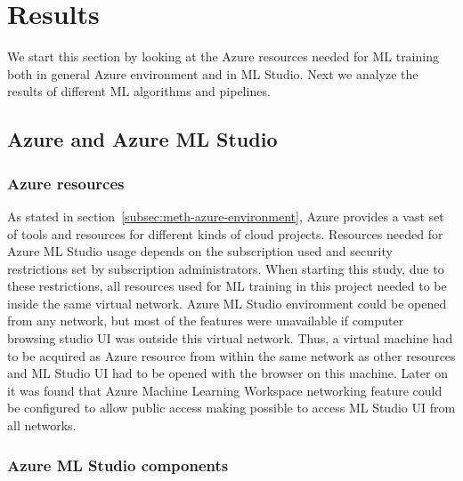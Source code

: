 

\section{Results}\label{sec:results}

We start this section by looking at
the Azure resources needed for ML training
both in general Azure environment and in ML Studio.
Next we analyze the results of
different ML algorithms and pipelines.


\subsection{Azure and Azure ML Studio}\label{subsec:res-azure-and-azure-ml-studio}

\subsubsection*{Azure resources}

As stated in section~\ref{subsec:meth-azure-environment},
Azure provides a vast set of tools and resources
for different kinds of cloud projects.
Resources needed for Azure ML Studio usage
depends on the subscription used
and security restrictions set by subscription administrators.
When starting this study,
due to these restrictions,
all resources used for ML training in this project
needed to be inside the same virtual network.
Azure ML Studio environment could be opened from any network,
but most of the features were unavailable
if computer browsing studio UI was outside this virtual network.
Thus,
a virtual machine had to be acquired as Azure resource
from within the same network as other resources
and ML Studio UI had to be opened with the browser on this machine.
Later on it was found
that Azure Machine Learning Workspace networking feature
could be configured to allow public access
making possible to access ML Studio UI from all networks.




\subsubsection*{Azure ML Studio components}

